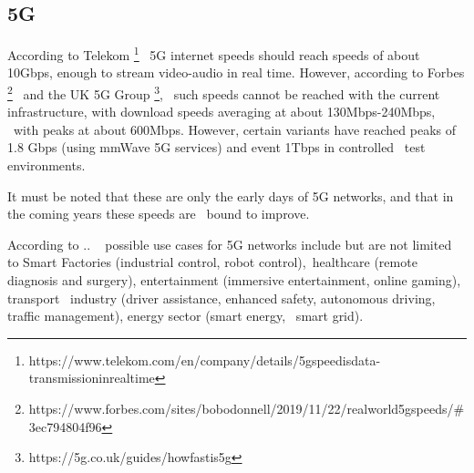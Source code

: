 
\subsection{5G}
\label{subsec:5g}
According to Telekom \footnote{https://www.telekom.com/en/company/details/5g\-speed\-is\-data-transmission\-in\-real\-time} \
5G internet speeds should reach speeds of about 10Gbps, enough to stream video-audio in real time.
However, according to Forbes \footnote{https://www.forbes.com/sites/bobodonnell/2019/11/22/real\-world\-5g\-speeds/\#3ec794804f96} \
and the UK 5G Group \footnote{https://5g.co.uk/guides/how\-fast\-is\-5g}, \
such speeds cannot be reached with the current infrastructure, with download speeds averaging at about 130Mbps-240Mbps, \
with peaks at about 600Mbps.
However, certain variants have reached peaks of 1.8 Gbps (using mmWave 5G services) and event 1Tbps in controlled \
test environments.

It must be noted that these are only the early days of 5G networks, and that in the coming years these speeds are \
bound to improve.

According to .. \ %
possible use cases for 5G networks include but are not limited to  Smart Factories (industrial control, robot control),\
 healthcare (remote diagnosis and surgery), entertainment (immersive entertainment, online gaming), transport \
industry (driver assistance, enhanced safety, autonomous driving, traffic management), energy sector (smart energy, \
smart grid).


